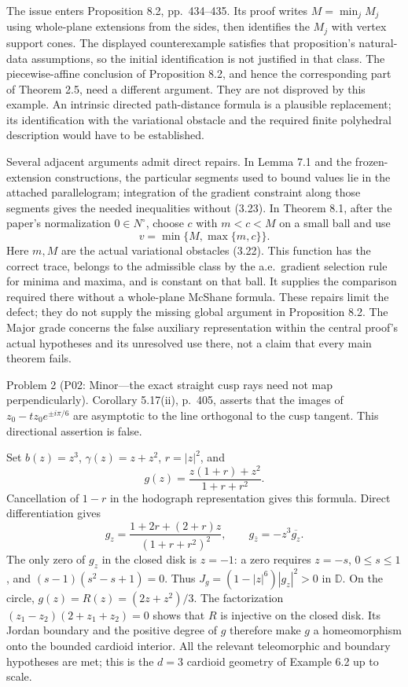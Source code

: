 \documentclass[10pt]{article}
\begin{document}
The issue enters Proposition 8.2, pp. 434–435. Its proof writes \(M=\min_jM_j\) using whole-plane extensions from the sides, then identifies the \(M_j\) with vertex support cones. The displayed counterexample satisfies that proposition’s natural-data assumptions, so the initial identification is not justified in that class. The piecewise-affine conclusion of Proposition 8.2, and hence the corresponding part of Theorem 2.5, need a different argument. They are not disproved by this example. An intrinsic directed path-distance formula is a plausible replacement; its identification with the variational obstacle and the required finite polyhedral description would have to be established.\par
Several adjacent arguments admit direct repairs. In Lemma 7.1 and the frozen-extension constructions, the particular segments used to bound values lie in the attached parallelogram; integration of the gradient constraint along those segments gives the needed inequalities without (3.23). In Theorem 8.1, after the paper’s normalization \(0\in N^\circ\), choose \(c\) with \(m<c<M\) on a small ball and use \[v=\min\{M,\max\{m,c\}\}.\] Here \(m,M\) are the actual variational obstacles (3.22). This function has the correct trace, belongs to the admissible class by the a.e. gradient selection rule for minima and maxima, and is constant on that ball. It supplies the comparison required there without a whole-plane McShane formula. These repairs limit the defect; they do not supply the missing global argument in Proposition 8.2. The Major grade concerns the false auxiliary representation within the central proof’s actual hypotheses and its unresolved use there, not a claim that every main theorem fails.\par
Problem 2 (P02: Minor—the exact straight cusp rays need not map perpendicularly).  Corollary 5.17(ii), p. 405, asserts that the images of \(z_0-tz_0e^{\pm i\pi/6}\) are asymptotic to the line orthogonal to the cusp tangent. This directional assertion is false.\par
Set \(b(z)=z^3\), \(\gamma(z)=z+z^2\), \(r=|z|^2\), and \[g(z)=\frac{z(1+r)+z^2}{1+r+r^2}.\] Cancellation of \(1-r\) in the hodograph representation gives this formula. Direct differentiation gives \[g_z=\frac{1+2r+(2+r)z}{(1+r+r^2)^2},
 \qquad g_{\bar z}=-z^3\overline{g_z}.\] The only zero of \(g_z\) in the closed disk is \(z=-1\): a zero requires \(z=-s\), \(0\leq s\leq1\), and \((s-1)(s^2-s+1)=0\). Thus \(J_g=(1-|z|^6)|g_z|^2>0\) in \(\mathbb D\). On the circle, \(g(z)=R(z)=(2z+z^2)/3\). The factorization \((z_1-z_2)(2+z_1+z_2)=0\) shows that \(R\) is injective on the closed disk. Its Jordan boundary and the positive degree of \(g\) therefore make \(g\) a homeomorphism onto the bounded cardioid interior. All the relevant teleomorphic and boundary hypotheses are met; this is the \(d=3\) cardioid geometry of Example 6.2 up to scale.\par
\end{document}
